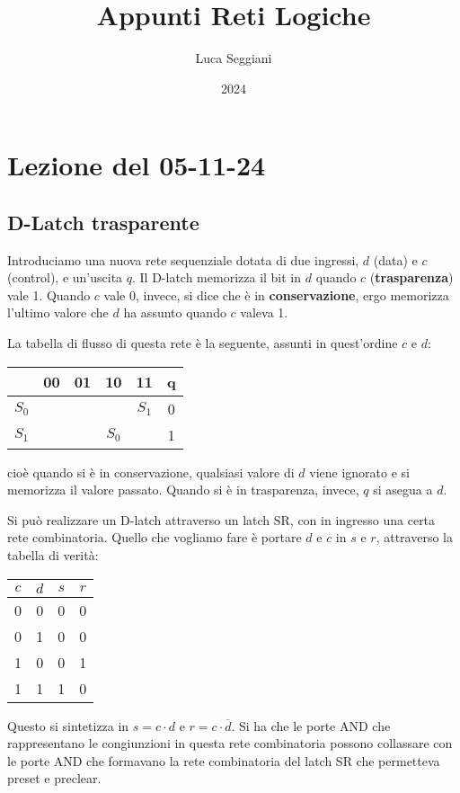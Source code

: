 \documentclass[a4paper,11pt]{article}
\title{Appunti Reti Logiche}
\author{Luca Seggiani}
\date{2024}
\begin{document}
\section{Lezione del 05-11-24}

\thispagestyle{empty}
\pagestyle{fancy}

\subsection{D-Latch trasparente}
Introduciamo una nuova rete sequenziale dotata di due ingressi, $d$ (data) e $c$ (control), e un'uscita $q$.
Il D-latch memorizza il bit in $d$ quando $c$ (\textbf{trasparenza}) vale 1.
Quando $c$ vale 0, invece, si dice che è in \textbf{conservazione}, ergo memorizza l'ultimo valore che $d$ ha assunto quando $c$ valeva 1.

La tabella di flusso di questa rete è la seguente, assunti in quest'ordine $c$ e $d$:
\begin{table}[h!]
	\center 
	\begin{tabular} { c | c  c  c  c | c }
		& 00 & 01 & 10 & 11 & q \\ 
		\hline 
		$S_0$ & \circled{$S_0$} & \circled{$S_0$} & \circled{$S_0$} & $S_1$ & 0 \\ 
		$S_1$ & \circled{$S_1$} & \circled{$S_1$} & $S_0$ & \circled{$S_1$} & 1\\
	\end{tabular}
\end{table}

cioè quando si è in conservazione, qualsiasi valore di $d$ viene ignorato e si memorizza il valore passato.
Quando si è in trasparenza, invece, $q$ si asegua a $d$.

Si può realizzare un D-latch attraverso un latch SR, con in ingresso una certa rete combinatoria.
Quello che vogliamo fare è portare $d$ e $c$ in $s$ e $r$, attraverso la tabella di verità:
\begin{table}[H]
	\center 
	\begin{tabular} { c  c | c  c }
		$c$ & $d$ & $s$ & $r$ \\
		\hline
		0 & 0 & 0 & 0 \\ 
		0 & 1 & 0 & 0 \\ 
		1 & 0 & 0 & 1 \\ 
		1 & 1 & 1 & 0
	\end{tabular}
\end{table}

Questo si sintetizza in $s = c \cdot d$ e $r = c \cdot \overline{d}$.
Si ha che le porte AND che rappresentano le congiunzioni in questa rete combinatoria possono collassare con le porte AND che formavano la rete combinatoria del latch SR che permetteva preset e preclear.
\end{document}
